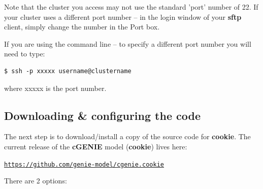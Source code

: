 \vspace{1mm}
Note that the cluster you access may not use the standard 'port' number of \textsf{\footnotesize 22}. If your cluster uses a different port number -- in the login window of your \textbf{sftp} client, simply change the number in the \textsf{\footnotesize Port} box.

If you are using the command line -- to specify a different port number you will need to type:
\vspace{-1mm}\begin{verbatim}
$ ssh -p xxxxx username@clustername
\end{verbatim}\vspace{-1mm}
where \textsf{\footnotesize xxxxx} is the port number.


\subsection{Downloading \& configuring the code}

The next step is to download/install a copy of the source code for \textbf{cookie}. The current release of the \textbf{cGENIE} model (\textbf{cookie}) lives here:

\vspace{1mm}
\href{https://github.com/genie-model/cgenie.cookie}{\texttt{https://github.com/genie-model/cgenie.cookie}}
\vspace{2mm}

\noindent There are 2 options:

